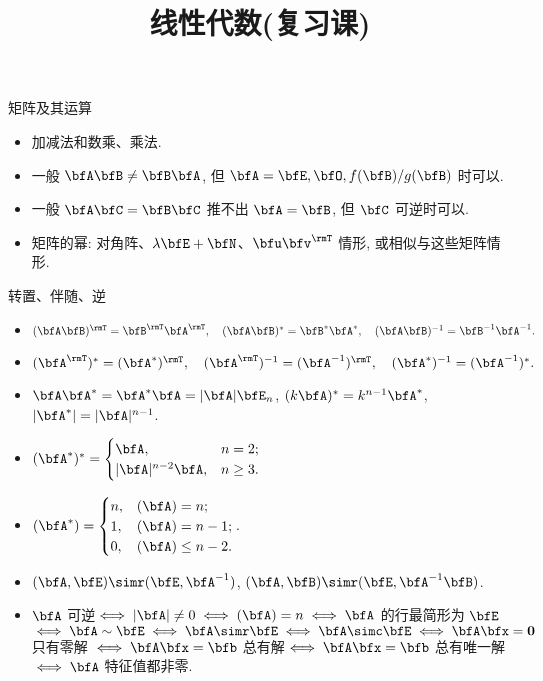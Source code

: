 \documentclass[aspectratio=169,handout]{ctexbeamer}
\title{线性代数(复习课)}
\let\rank\relax\DeclareMathOperator\rank{\rank}
\begin{document}
\begin{frame}{矩阵及其运算}
	\onslide<+->
	\begin{itemize}
		\item 加减法和数乘、乘法.
		\item 一般 $\bfA\bfB\neq \bfB\bfA$, 但 $\bfA=\bfE,\bfO,f(\bfB)/g(\bfB)$ 时可以.
		\item 一般 $\bfA\bfC=\bfB\bfC$ 推不出 $\bfA=\bfB$, 但 $\bfC$ 可逆时可以.
		\item 矩阵的幂: 对角阵、$\lambda \bfE+\bfN$、$\bfu\bfv^\rmT$ 情形, 或相似与这些矩阵情形.
	\end{itemize}
\end{frame}
	
	
\begin{frame}{转置、伴随、逆}
	\onslide<+->
	\begin{itemize}
		\item $(\bfA\bfB)^\rmT=\bfB^\rmT\bfA^\rmT,\quad
			(\bfA\bfB)^*=\bfB^*\bfA^*,\quad
			(\bfA\bfB)^{-1}=\bfB^{-1}\bfA^{-1}.$
		\item $(\bfA^\rmT)^*=(\bfA^*)^\rmT,\quad
			(\bfA^\rmT)^{-1}=(\bfA^{-1})^\rmT,\quad
			(\bfA^*)^{-1}=(\bfA^{-1})^*.$
		\item $\bfA\bfA^*=\bfA^*\bfA=|\bfA|\bfE_n$, $(k\bfA)^*=k^{n-1}\bfA^*$,  $|\bfA^*|=|\bfA|^{n-1}$.
		\item $(\bfA^*)^*=\begin{cases}
			\bfA,&n=2;\\
			|\bfA|^{n-2}\bfA,&n\ge3.
		\end{cases}$
		\item $\rank(\bfA^*)=\begin{cases}
			n,&\rank(\bfA)=n;\\
			1,&\rank(\bfA)=n-1;\\
			0,&\rank(\bfA)\le n-2.
		\end{cases}.$
		\item $(\bfA,\bfE)\simr (\bfE,\bfA^{-1})$,
		$(\bfA,\bfB)\simr (\bfE,\bfA^{-1}\bfB)$.
		\item $\bfA$ 可逆$\iff |\bfA|\neq0 \iff \rank(\bfA)=n\iff\bfA$ 的行最简形为 $\bfE$ $\iff\bfA\sim\bfE\iff\bfA\simr\bfE\iff\bfA\simc\bfE\iff\bfA\bfx={\bf0}$ 只有零解 $\iff\bfA\bfx=\bfb$ 总有解$\iff\bfA\bfx=\bfb$ 总有唯一解 $\iff\bfA$ 特征值都非零.
	\end{itemize}
\end{frame}
\end{document}
